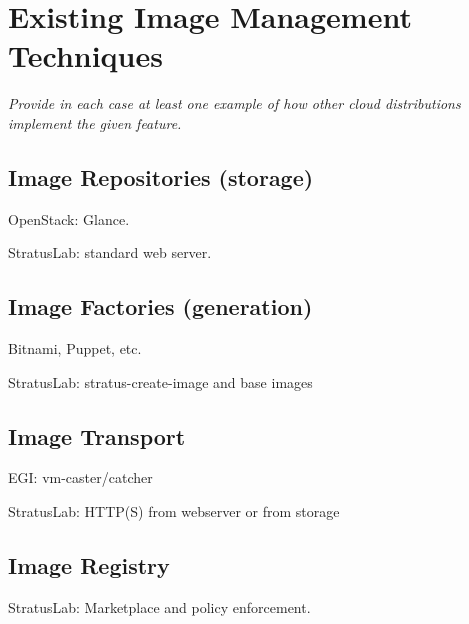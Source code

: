 \section{Existing Image Management Techniques}
\label{sec:other-approaches}

{\em Provide in each case at least one example of how other cloud
  distributions implement the given feature.}

\subsection{Image Repositories (storage)}

OpenStack: Glance.

StratusLab: standard web server.

\subsection{Image Factories (generation)}

Bitnami, Puppet, etc.

StratusLab: stratus-create-image and base images

\subsection{Image Transport}

EGI: vm-caster/catcher

StratusLab: HTTP(S) from webserver or from storage

\subsection{Image Registry}

StratusLab: Marketplace and policy enforcement.

